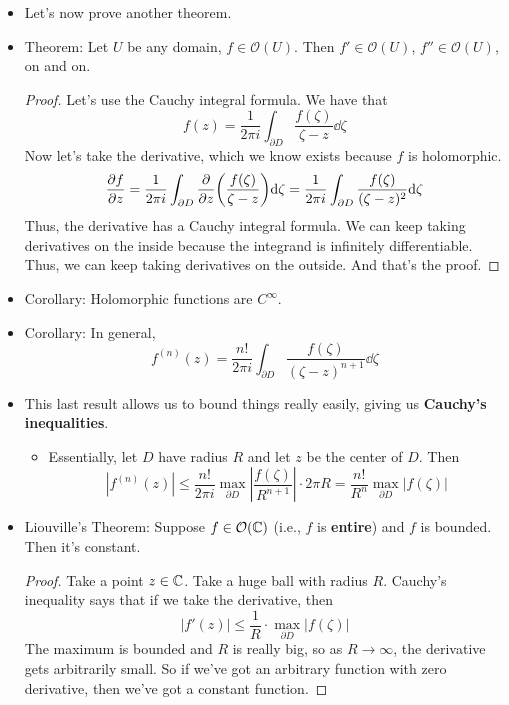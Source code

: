 \documentclass[../notes.tex]{subfiles}
\begin{document}
\begin{itemize}
    \item Let's now prove another theorem.
    \item Theorem: Let $U$ be any domain, $f\in\mathcal{O}(U)$. Then $f'\in\mathcal{O}(U)$, $f''\in\mathcal{O}(U)$, on and on.
    \begin{proof}
        Let's use the Cauchy integral formula. We have that
        \begin{equation*}
            f(z) = \frac{1}{2\pi i}\int_{\partial D}\frac{f(\zeta)}{\zeta-z}\dd\zeta
        \end{equation*}
        Now let's take the derivative, which we know exists because $f$ is holomorphic.
        \begin{equation*}
            \pdv{f}{z} = \frac{1}{2\pi i}\int_{\partial D}\pdv{z}(\frac{f(\zeta)}{\zeta-z})\dd\zeta
            = \frac{1}{2\pi i}\int_{\partial D}\frac{f(\zeta)}{(\zeta-z)^2}\dd\zeta
        \end{equation*}
        Thus, the derivative has a Cauchy integral formula. We can keep taking derivatives on the inside because the integrand is infinitely differentiable. Thus, we can keep taking derivatives on the outside. And that's the proof.
    \end{proof}
    \item Corollary: Holomorphic functions are $C^\infty$.
    \item Corollary: In general,
    \begin{equation*}
        f^{(n)}(z) = \frac{n!}{2\pi i}\int_{\partial D}\frac{f(\zeta)}{(\zeta-z)^{n+1}}\dd\zeta
    \end{equation*}
    \item This last result allows us to bound things really easily, giving us \textbf{Cauchy's inequalities}.
    \begin{itemize}
        \item Essentially, let $D$ have radius $R$ and let $z$ be the center of $D$. Then
        \begin{equation*}
            |f^{(n)}(z)| \leq \frac{n!}{2\pi i}\max_{\partial D}\left| \frac{f(\zeta)}{R^{n+1}} \right|\cdot 2\pi R
            = \frac{n!}{R^n}\max_{\partial D}|f(\zeta)|
        \end{equation*}
    \end{itemize}
    \item Liouville's Theorem: Suppose $f\in\mathcal{O}(\mathbb{C})$ (i.e., $f$ is \textbf{entire}) and $f$ is bounded. Then it's constant.
    \begin{proof}
        Take a point $z\in\mathbb{C}$. Take a huge ball with radius $R$. Cauchy's inequality says that if we take the derivative, then
        \begin{equation*}
            |f'(z)| \leq \frac{1}{R}\cdot\max_{\partial D}|f(\zeta)|
        \end{equation*}
        The maximum is bounded and $R$ is really big, so as $R\to\infty$, the derivative gets arbitrarily small. So if we've got an arbitrary function with zero derivative, then we've got a constant function.
    \end{proof}
\end{itemize}
\end{document}
